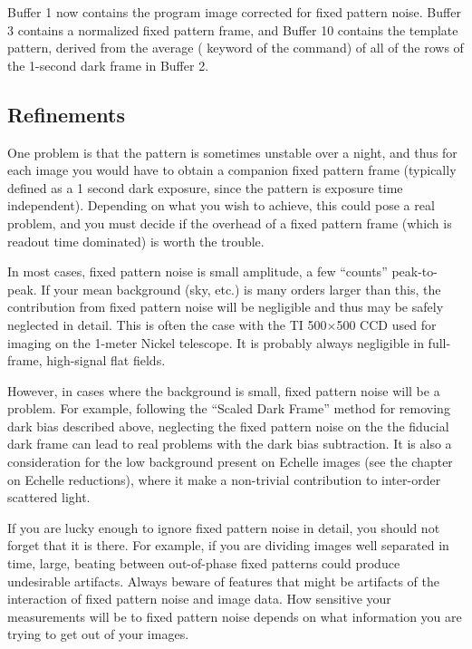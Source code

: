 \noindent Buffer 1 now contains the program image corrected for fixed pattern
noise.  Buffer 3 contains a normalized fixed pattern frame, and Buffer 10
contains the template pattern, derived from the average ( keyword
of the  command) of all of the rows of the 1-second dark frame in
Buffer 2. 

\subsection{Refinements}
\nobreak
One problem is that the pattern is sometimes unstable over a night, and thus
for each image you would have to obtain a companion fixed pattern frame
(typically defined as a 1 second dark exposure, since the pattern is exposure
time independent).  Depending on what you wish to achieve, this could pose
a real problem, and you must decide if the overhead of a fixed pattern
frame (which is readout time dominated) is worth the trouble.

In most cases, fixed pattern noise is small amplitude, a few ``counts''
peak-to-peak.  If your mean background (sky, etc.) is many orders larger than
this, the contribution from fixed pattern noise will be negligible and thus
may be safely neglected in detail.  This is often the case with the TI
500$\times$500 CCD used for imaging on the 1-meter Nickel telescope. It is
probably always negligible in full-frame, high-signal flat fields. 

However, in cases where the background is small, fixed pattern noise will be a
problem.  For example, following the ``Scaled Dark Frame'' method for removing
dark bias described above, neglecting the fixed pattern noise on the the
fiducial dark frame can lead to real problems with the dark bias subtraction. 
It is also a consideration for the low background present on Echelle images
(see the chapter on Echelle reductions), where it make a non-trivial
contribution to inter-order scattered light. 

If you are lucky enough to ignore fixed pattern noise in detail, you should
not forget that it is there.  For example, if you are dividing images well
separated in time, large, beating between out-of-phase fixed patterns could
produce undesirable artifacts.  Always beware of features that might be
artifacts of the interaction of fixed pattern noise and image data.  How
sensitive your measurements will be to fixed pattern noise depends on what
information you are trying to get out of your images. 


